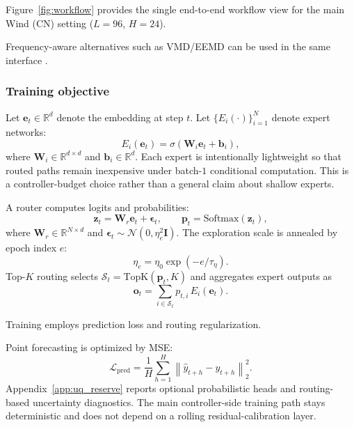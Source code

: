 \documentclass[review,1p,times]{elsarticle}
\begin{document}
Figure~\ref{fig:workflow} provides the single end-to-end workflow view for the main Wind (CN) setting ($L=96$, $H=24$).

Frequency-aware alternatives such as VMD/EEMD can be used in the same interface \cite{dragomiretskiy2014vmd,wu2009eemd}.

\subsubsection{Training objective}
Let $\mathbf{e}_t \in \mathbb{R}^{d}$ denote the embedding at step $t$. Let $\{E_i(\cdot)\}_{i=1}^{N}$ denote expert networks:
\begin{equation}
E_i(\mathbf{e}_t)=\sigma(\mathbf{W}_i\mathbf{e}_t+\mathbf{b}_i),
\end{equation}
where $\mathbf{W}_i \in \mathbb{R}^{d\times d}$ and $\mathbf{b}_i \in \mathbb{R}^{d}$.
Each expert is intentionally lightweight so that routed paths remain inexpensive under batch-$1$ conditional computation. This is a controller-budget choice rather than a general claim about shallow experts.

A router computes logits and probabilities:
\begin{equation}
\mathbf{z}_t = \mathbf{W}_r\mathbf{e}_t + \boldsymbol{\epsilon}_t,\qquad
\mathbf{p}_t = \mathrm{Softmax}(\mathbf{z}_t),
\label{eq:router_softmax}
\end{equation}
where $\mathbf{W}_r\in\mathbb{R}^{N\times d}$ and $\boldsymbol{\epsilon}_t\sim\mathcal{N}(0,\eta_e^2\mathbf{I})$. The exploration scale is annealed by epoch index $e$:
\begin{equation}
\eta_e=\eta_0\exp(-e/\tau_{\eta}).
\label{eq:router_anneal}
\end{equation}
Top-$K$ routing selects $\mathcal{S}_t=\mathrm{TopK}(\mathbf{p}_t,K)$ and aggregates expert outputs as
\begin{equation}
\mathbf{o}_t = \sum_{i\in\mathcal{S}_t} p_{t,i}\,E_i(\mathbf{e}_t).
\label{eq:moe_topk}
\end{equation}


\label{subsec:method_edge_train}
Training employs prediction loss and routing regularization.

Point forecasting is optimized by MSE:
\begin{equation}
\mathcal{L}_{\text{pred}} = \frac{1}{H}\sum_{h=1}^{H}\left\|\hat{y}_{t+h}-y_{t+h}\right\|_2^2.
\label{eq:loss_pred}
\end{equation}
Appendix~\ref{app:uq_reserve} reports optional probabilistic heads and routing-based uncertainty diagnostics. The main controller-side training path stays deterministic and does not depend on a rolling residual-calibration layer.
\end{document}
